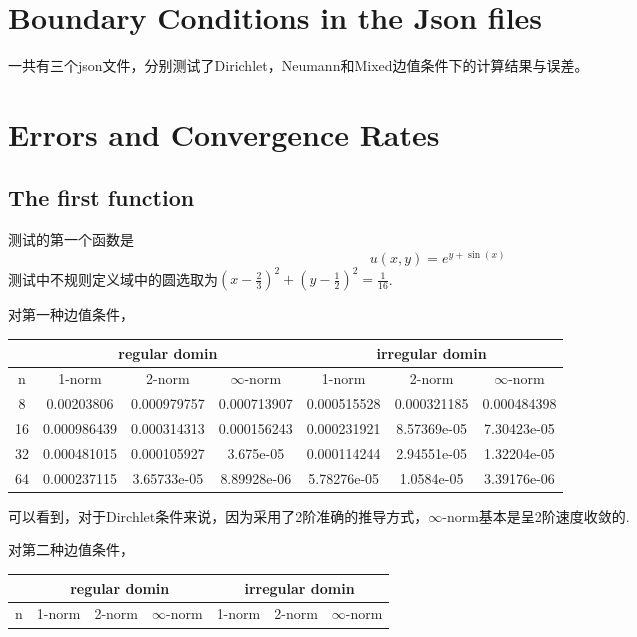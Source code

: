 \documentclass[a4paper,11.5pt,UTF8]{ctexart}
\begin{document}
\begin{large}
	
\section{Boundary Conditions in the Json files}
\par 一共有三个json文件，分别测试了Dirichlet，Neumann和Mixed边值条件下的计算结果与误差。
	
\section{Errors and Convergence Rates}
\subsection{The first function}
\par 测试的第一个函数是
$$u(x,y) = e^{y+\sin(x)}$$
测试中不规则定义域中的圆选取为$(x-\frac{2}{3})^2+(y-\frac{1}{2})^2=\frac{1}{16}$.
\par 对第一种边值条件，
\begin{center}
\begin{tabular}{|c|c|c|c|c|c|c|}
	\hline
	& \multicolumn{3}{c|}{regular domin} & \multicolumn{3}{c|}{irregular domin} \\
	\hline
	n & 1-norm & 2-norm & $\infty$-norm & 1-norm &	2-norm& $\infty$-norm \\
	\hline
	8& 0.00203806 & 0.000979757 & 0.000713907 & 0.000515528 & 0.000321185 & 0.000484398 \\
	\hline
	16& 0.000986439 & 0.000314313 & 0.000156243 & 0.000231921 &8.57369e-05	&7.30423e-05\\
	\hline
	32& 0.000481015 & 0.000105927 & 3.675e-05 & 0.000114244 &2.94551e-05&1.32204e-05\\
	\hline
	64& 0.000237115 & 3.65733e-05 & 8.89928e-06 & 5.78276e-05 &1.0584e-05	&3.39176e-06 \\
	\hline
\end{tabular}
\end{center}
可以看到，对于Dirchlet条件来说，因为采用了2阶准确的推导方式，$\infty$-norm基本是呈2阶速度收敛的.
\par 对第二种边值条件，
\begin{center}
\begin{tabular}{|c|c|c|c|c|c|c|}
	\hline
	& \multicolumn{3}{c|}{regular domin} & \multicolumn{3}{c|}{irregular domin} \\
	\hline
	n & 1-norm & 2-norm & $\infty$-norm & 1-norm &	2-norm& $\infty$-norm \\

\end{tabular}
\end{center}
\end{large}
\end{document}

